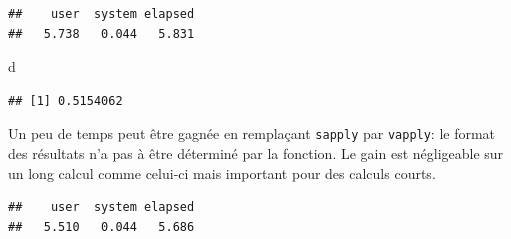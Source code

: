 \documentclass[
  12pt,
  french,
  a4paper,
  extrafontsizes,onecolumn,openright
  ]{memoir}
\newenvironment{Shaded}{\begin{snugshade}}{\end{snugshade}}
\newcommand{\ControlFlowTok}[1]{\textcolor[rgb]{0.13,0.29,0.53}{\textbf{#1}}}
\newcommand{\DecValTok}[1]{\textcolor[rgb]{0.00,0.00,0.81}{#1}}
\newcommand{\KeywordTok}[1]{\textcolor[rgb]{0.13,0.29,0.53}{\textbf{#1}}}
\newcommand{\NormalTok}[1]{#1}
\newcommand{\OperatorTok}[1]{\textcolor[rgb]{0.81,0.36,0.00}{\textbf{#1}}}
\newcommand{\StringTok}[1]{\textcolor[rgb]{0.31,0.60,0.02}{#1}}
\begin{document}
\begin{verbatim}
##    user  system elapsed 
##   5.738   0.044   5.831
\end{verbatim}

\begin{Shaded}
\begin{Highlighting}[]
\NormalTok{d}
\end{Highlighting}
\end{Shaded}

\begin{verbatim}
## [1] 0.5154062
\end{verbatim}

\normalsize

Un peu de temps peut être gagnée en remplaçant \texttt{sapply} par \texttt{vapply}: le format des résultats n'a pas à être déterminé par la fonction.
Le gain est négligeable sur un long calcul comme celui-ci mais important pour des calculs courts.

\scriptsize

\begin{Shaded}
\end{Shaded}

\begin{verbatim}
##    user  system elapsed 
##   5.510   0.044   5.686
\end{verbatim}
\end{document}
